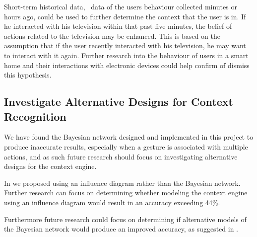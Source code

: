 Short-term historical data, \ie~data of the users behaviour collected minutes or hours ago, could be used to further determine the context that the user is in. If he interacted with his television within that past five minutes, the belief of actions related to the television may be enhanced. This is based on the assumption that if the user recently interacted with his television, he may want to interact with it again. Further research into the behaviour of users in a smart home and their interactions with electronic devices could help confirm of dismiss this hypothesis.

\subsection{Investigate Alternative Designs for Context Recognition}

We have found the Bayesian network designed and implemented in this project to produce inaccurate results, especially when a gesture is associated with multiple actions, and as such future research should focus on investigating alternative designs for the context engine.

In  we proposed using an influence diagram rather than the Bayesian network. Further research can focus on determining whether modeling the context engine using an influence diagram would result in an accuracy exceeding 44\%.

Furthermore future research could focus on determining if alternative models of the Bayesian network would produce an improved accuracy, as suggested in .

